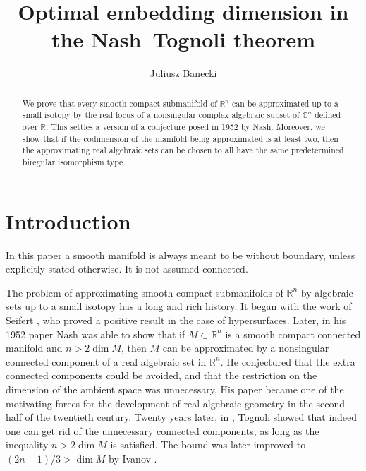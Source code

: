 \documentclass{amsart}
\title{Optimal embedding dimension in the Nash--Tognoli theorem}
\author{Juliusz Banecki}
\theoremstyle{plain}
\theoremstyle{definition}
\theoremstyle{remark}
\numberwithin{equation}{thm} %
\newcommand{\R}{\mathbb{R}}
\newcommand{\C}{\mathbb{C}}
\begin{document}
\begin{abstract}
We prove that every smooth compact submanifold of $\R^n$ can be approximated up to a small isotopy by the real locus of a nonsingular complex algebraic subset of $\C^n$ defined over $\R$. This settles a version of a conjecture posed in 1952 by Nash. Moreover, we show that if the codimension of the manifold being approximated is at least two, then the approximating real algebraic sets can be chosen to all have the same predetermined biregular isomorphism type.  
\end{abstract}
\maketitle
\section{Introduction}
In this paper a smooth manifold is always meant to be without boundary, unless explicitly stated otherwise. It is not assumed connected. 

The problem of approximating smooth compact submanifolds of $\R^n$ by algebraic sets up to a small isotopy has a long and rich history. It began with the work of Seifert \cite{seifertAlgebraischeApproximationMannigfaltigkeiten1936}, who proved a positive result in the case of hypersurfaces. Later, in his 1952 paper \cite{nashRealAlgebraicManifolds1952} Nash was able to show that if $M\subset \R^n$ is a smooth compact connected manifold and $n>2 \dim M$, then $M$ can be approximated by a nonsingular connected component of a real algebraic set in $\R^n$. He conjectured that the extra connected components could be avoided, and that the restriction on the dimension of the ambient space was unnecessary. His paper became one of the motivating forces for the development of real algebraic geometry in the second half of the twentieth century. Twenty years later, in \cite{tognoliSuCongetturaDi1973}, Tognoli showed that indeed one can get rid of the unnecessary connected components, as long as the inequality $n>2 \dim M$ is satisfied. The bound was later improved to $(2n-1)/3>\dim M$ by Ivanov \cite{ivanovImprovementNashTognoliTheorem1984}. 
\end{document}

